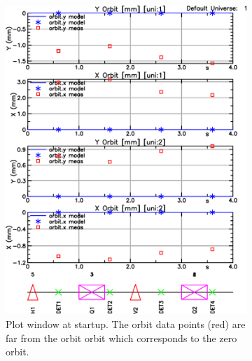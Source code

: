 \documentclass{hitec}     %
\begin{document}
{\begin{figure}[t]
  \centering
  \begin{subfigure}[t]{0.49\textwidth}
    \includegraphics[width=\textwidth]{cor0.pdf}
    \caption{Plot window at startup. The  orbit data points (red) 
are far from the  orbit orbit which corresponds to the zero orbit.}
    \label{f:cor0}
  \end{subfigure}
  \hfil
  \begin{subfigure}[t]{0.49\textwidth}

\end{subfigure}
\end{figure}}
\end{document}
